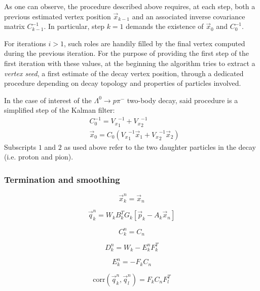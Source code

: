 As one can observe, the procedure described above requires, at each step, both a previous estimated vertex position $\vec{x}_{k-1}$ and an associated inverse covariance matrix $C_{k-1}^{-1}$. In particular, step $k=1$ demands the existence of $\vec{x}_0$ and $C_{0}^{-1}$.

For iterations $i>1$, such roles are handily filled by the final vertex computed during the previous iteration. For the purpose of providing the first step of the first iteration with these values, at the beginning the algorithm tries to extract a \textit{vertex seed}, a first estimate of the decay vertex position, through a dedicated procedure depending on decay topology and properties of particles involved.

In the case of interest of the $\Lambda^0 \rightarrow p \pi^-$ two-body decay, said procedure is a simplified step of the Kalman filter:
\begin{subequations}
\begin{align}
	&C^{-1}_0 = {V_x}^{-1}_1 + {V_x}^{-1}_2 \\
	&\vec{x}_0 = C_0 \left(
		{V_x}^{-1}_1 \vec{x}_1 + {V_x}^{-1}_2 \vec{x}_2
	\right)
\end{align}
\end{subequations}
Subscripts $1$ and $2$ as used above refer to the two daughter particles in the decay (i.e. proton and pion).

\subsubsection{Termination and smoothing}
\begin{equation}
\vec{x}_k^n = \vec{x}_n
\end{equation}

\begin{equation}
\vec{q}_k^n = W_k B_k^T G_k \left[
	\vec{p}_k - A_k \vec{x}_n
\right]
\end{equation}

\begin{equation}
C_k^n = C_n
\end{equation}

\begin{equation}
D_k^n = W_k - E_k^n F_k^T
\end{equation}

\begin{equation}
E_k^n = - F_k C_n
\end{equation}

\begin{equation}
\text{corr}\left(
	\vec{q}_k^n, \vec{q}_l^n
\right) = F_k C_n F_l^T
\end{equation}

